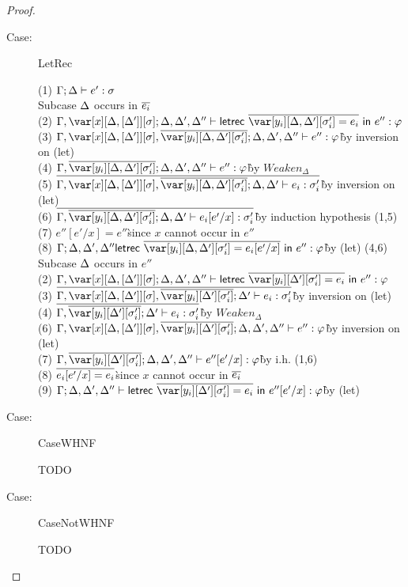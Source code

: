 \begin{proof}
\begin{description}
\item[Case:] LetRec
\begin{tabbing}
    (1) $\Gamma; \Delta \vdash e' : \sigma$\\
    Subcase $\Delta$ occurs in $\overline{e_i}$\\
    (2) $\G,\xD; \D, \D', \D'' \vdash \lletrec{\ov{\var[y_i][\D,\D'][\s_i'] = e_i}}{e''} : \vp$\\
    (3) $\G,\xD,\ov{\var[y_i][\D,\D'][\s'_i]}; \D,\D',\D'' \vdash e'' : \vp$\` by inversion on (let)\\
    (4) $\G,\ov{\var[y_i][\D,\D'][\s'_i]}; \D,\D',\D'' \vdash e'' : \vp$\` by $Weaken_\Delta$\\
    (5) $\ov{\G,\xD,\ov{\var[y_i][\D,\D'][\s'_i]}; \D, \D' \vdash e_i : \s'_i}$\` by inversion on (let)\\
    (6) $\ov{\G,\ov{\var[y_i][\D,\D'][\s'_i]}; \D,\D' \vdash e_i[e'/x] : \s'_i}$\` by induction hypothesis (1,5)\\
    (7) $e''[e'/x] = e''$\` since $x$ cannot occur in $e''$\\
    (8) $\G; \D,\D',\D'' \lletrec{\ov{\var[y_i][\D,\D'][\s_i'] = e_i[e'/x]}}{e''} : \vp$\` by (let) (4,6)\\
    Subcase $\Delta$ occurs in $e''$\\
    (2) $\G, \xD; \D, \D', \D'' \vdash \lletrec{\ov{\var[y_i][\D'][\s_i'] = e_i}}{e''} : \vp$\\
    (3) $\ov{\G,\xD,\ov{\var[y_i][\D'][\s'_i]}; \D' \vdash e_i : \s'_i}$\` by inversion on (let)\\
    (4) $\ov{\G,\ov{\var[y_i][\D'][\s'_i]}; \D' \vdash e_i : \s'_i}$\` by $Weaken_\Delta$\\
    (6) $\G,\xD,\ov{\var[y_i][\D'][\s'_i]}; \D,\D',\D'' \vdash e'' : \vp$\` by inversion on (let)\\
    (7) $\G,\ov{\var[y_i][\D'][\s'_i]}; \D,\D',\D'' \vdash e''[e'/x] : \vp$\` by i.h. (1,6)\\
    (8) $\overline{e_i[e'/x] = e_i}$\` since $x$ cannot occur in $\overline{e_i}$\\
    (9) $\G;\D,\D',\D'' \vdash \lletrec{\ov{\var[y_i][\D'][\s'_i] = e_i}}{e''[e'/x]} : \vp$\` by (let)\\
\end{tabbing}

\item[Case:] CaseWHNF
\begin{tabbing}
    TODO
\end{tabbing}

\item[Case:] CaseNotWHNF
\begin{tabbing}
    TODO
\end{tabbing}

\end{description}

\end{proof}


